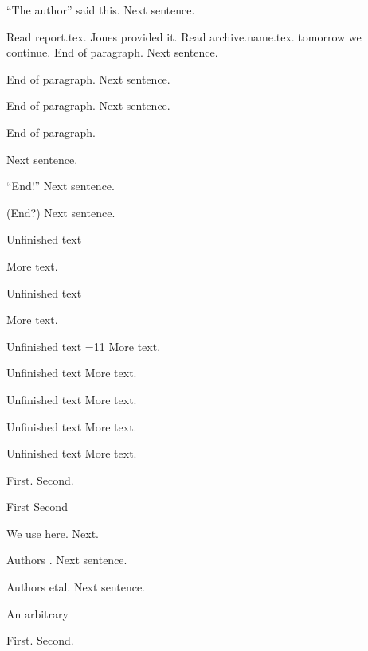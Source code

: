 \enquote{The author} said this.
Next sentence.

Read report.tex.
Jones provided it.
Read archive.name.tex.
tomorrow we continue.
End of paragraph.
\vspace{1em}
Next sentence.

End of paragraph.
\bigskip
Next sentence.

End of paragraph.
\newpage
Next sentence.

End of paragraph.

Next sentence.

“End!”
\vspace{1em}
Next sentence.

(End?)
\vspace{1em}
Next sentence.

Unfinished text

More text.

Unfinished text

More text.

Unfinished text
=11
More text.

Unfinished text
\def\x{value}
More text.

Unfinished text
\gdef\x{value}
More text.

Unfinished text
\edef\x{value}
More text.

Unfinished text
\xdef\x{value}
More text.

\newenvironment{local}{}{}
\begin{local}
  First. Second.
\end{local}

\begin{itemize}
    \myitem First \myitem Second
\end{itemize}

We use  here.
Next.

Authors \etal.
Next sentence.

Authors etal.
Next sentence.

An arbitrary \macro [0,1) works.
Next sentence.

\newtheorem{localnumbered}{Local}
\begin{localnumbered}
  First.
  Second.
\end{localnumbered}

\newtheorem*{localstar}{Local}
\begin{localstar}
  First.
  Second.
\end{localstar}

\declaretheorem[title={a ] b}]{localdeclared}
\begin{localdeclared}
First.
Second.
\end{localdeclared}

